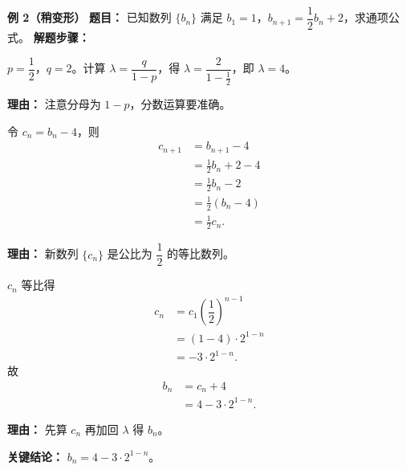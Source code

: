 \begin{examplebox}
	\medskip
	\textbf{\textcolor{CExample}{例 2（稍变形）}}
	\textbf{\textcolor{CExample}{题目：}}
	已知数列 $\{b_n\}$ 满足 $b_1=1$，$b_{n+1}=\dfrac12 b_n+2$，求通项公式。
	\textbf{\textcolor{CExample}{解题步骤：}}
	\begin{description}[style=nextline,leftmargin=2.8em,labelsep=0.5em,itemsep=0.45em]
		\item[\textbf{第一步（计算$\lambda$）：}]
			$p=\dfrac12$，$q=2$。计算 $\lambda=\dfrac{q}{1-p}$，得 $\lambda=\dfrac{2}{1-\frac12}$，即 $\lambda=4$。
			\par\textbf{理由：} 注意分母为 $1-p$，分数运算要准确。
		\item[\textbf{第二步（构造等比）：}]
			令 $c_n=b_n-4$，则
			\[
				\begin{aligned}
					c_{n+1} &= b_{n+1}-4 \\ &= \frac12 b_n+2-4 \\ &= \frac12 b_n-2 \\ &= \frac12(b_n-4) \\ &= \frac12 c_n.
			\end{aligned}
			\]
			\par\textbf{理由：} 新数列 $\{c_n\}$ 是公比为 $\dfrac12$ 的等比数列。
		\item[\textbf{第三步（求通项）：}]
			$c_n$ 等比得
			\[
				\begin{aligned}
					c_n &= c_1\left(\dfrac12\right)^{n-1} \\ &= (1-4)\cdot2^{1-n} \\ &= -3\cdot2^{1-n}.
			\end{aligned}
			\]
			故
			\[
				\begin{aligned}
					b_n &= c_n+4 \\ &= 4-3\cdot2^{1-n}.
			\end{aligned}
			\]
			\par\textbf{理由：} 先算 $c_n$ 再加回 $\lambda$ 得 $b_n$。
	\end{description}
	\textbf{\textcolor{CExample}{关键结论：}}
	\textbf{$b_n=4-3\cdot2^{1-n}$}。


\end{examplebox}
